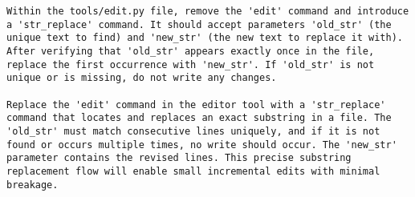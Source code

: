 \begin{lstlisting}
Within the tools/edit.py file, remove the 'edit' command and introduce a 'str_replace' command. It should accept parameters 'old_str' (the unique text to find) and 'new_str' (the new text to replace it with). After verifying that 'old_str' appears exactly once in the file, replace the first occurrence with 'new_str'. If 'old_str' is not unique or is missing, do not write any changes.

Replace the 'edit' command in the editor tool with a 'str_replace' command that locates and replaces an exact substring in a file. The 'old_str' must match consecutive lines uniquely, and if it is not found or occurs multiple times, no write should occur. The 'new_str' parameter contains the revised lines. This precise substring replacement flow will enable small incremental edits with minimal breakage.
\end{lstlisting}